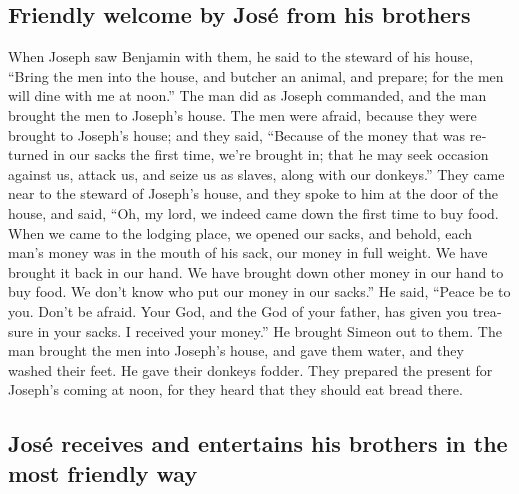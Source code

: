 \begin{paracol}{2}
\begin{otherlanguage}{english}
\hypertarget{friendly-welcome-by-josuxe9-from-his-brothers}{%
\subsection{Friendly welcome by José from his
brothers}\label{friendly-welcome-by-josuxe9-from-his-brothers}}

 When Joseph saw Benjamin with them, he said to the
steward of his house, ``Bring the men into the house, and butcher an
animal, and prepare; for the men will dine with me at noon.''
 The man did as Joseph commanded, and the man brought the
men to Joseph's house.  The men were afraid, because they
were brought to Joseph's house; and they said, ``Because of the money
that was returned in our sacks the first time, we're brought in; that he
may seek occasion against us, attack us, and seize us as slaves, along
with our donkeys.''  They came near to the steward of
Joseph's house, and they spoke to him at the door of the house,
 and said, ``Oh, my lord, we indeed came down the first
time to buy food.  When we came to the lodging place, we
opened our sacks, and behold, each man's money was in the mouth of his
sack, our money in full weight. We have brought it back in our hand.
 We have brought down other money in our hand to buy
food. We don't know who put our money in our sacks.''  He
said, ``Peace be to you. Don't be afraid. Your God, and the God of your
father, has given you treasure in your sacks. I received your money.''
He brought Simeon out to them.  The man brought the men
into Joseph's house, and gave them water, and they washed their feet. He
gave their donkeys fodder.  They prepared the present for
Joseph's coming at noon, for they heard that they should eat bread
there.

\hypertarget{josuxe9-receives-and-entertains-his-brothers-in-the-most-friendly-way}{%
\subsection{José receives and entertains his brothers in the most
friendly
way}\label{josuxe9-receives-and-entertains-his-brothers-in-the-most-friendly-way}}


\end{otherlanguage}
\end{paracol}
